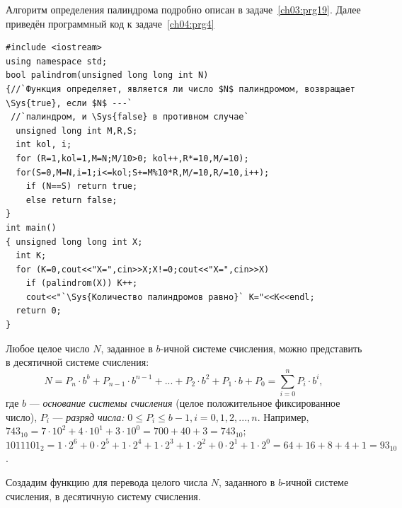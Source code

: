 
Алгоритм определения палиндрома подробно описан в задаче~\ref{ch03:prg19}. 
Далее приведён программный код к задаче~\ref{ch04:prg4}

\begin{lstlisting}
#include <iostream>
using namespace std;
bool palindrom(unsigned long long int N)
{//`Функция определяет, является ли число $N$ палиндромом, возвращает \Sys{true}, если $N$ ---`
 //`палиндром, и \Sys{false} в противном случае`
  unsigned long int M,R,S; 
  int kol, i;
  for (R=1,kol=1,M=N;M/10>0; kol++,R*=10,M/=10);
  for(S=0,M=N,i=1;i<=kol;S+=M%10*R,M/=10,R/=10,i++);
    if (N==S) return true;
    else return false;
}
int main()
{ unsigned long long int X;
  int K;
  for (K=0,cout<<"X=",cin>>X;X!=0;cout<<"X=",cin>>X)
    if (palindrom(X)) K++;
    cout<<"`\Sys{Количество палиндромов равно}` K="<<K<<endl;
  return 0;
}
\end{lstlisting}


Любое целое число $N$, заданное в $b$-ичной системе счисления, можно представить в десятичной системе счисления: 
\begin{equation*}
N=P_n\cdot b^b+P_{n-1}\cdot b^{n-1}+...+P_2\cdot b^2+P_1\cdot b+P_0=\sum_{i=0}^n{P_i\cdot b^i},
\end{equation*}
где $b$ --- \emph{основание системы счисления} (целое положительное фиксированное число), 
$P_i$  --- \emph{разряд числа:} 
$0\leqslant P_i\leqslant b-1,i=0,1,2,...,n.$
Например,\\
$743_{10}=7\cdot 10^2+4\cdot 10^1+3\cdot 10^0=700+40+3=743_{10}$;\ \  
$1011101_2=1\cdot 2^6+0\cdot 2^5+1\cdot 2^4+1\cdot 2^3+1\cdot 2^2+0\cdot 2^1+1\cdot
2^0=64+16+8+4+1=93_{10}$.

Создадим функцию для перевода целого числа $N$, заданного в
$b$-ичной системе счисления, в десятичную систему счисления.

